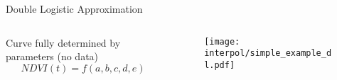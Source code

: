 
\begin{frame}[fragile]{Double Logistic Approximation}
    \begin{columns}
        \begin{column}{0.45\textwidth}
            Curve fully determined by parameters (no data)
            $$
                NDVI(t) = f(a,b,c,d,e)
            $$
            
        \end{column}
        \begin{column}{0.45\textwidth}
            \begin{figure}
                \texttt{[image: interpol/simple\_example\_dl.pdf]}
            \end{figure}
        \end{column}
    \end{columns}
\end{frame}





\newcommand{\RobItPlot}{fitted to different (SCL45) NDVI {TS}. Iterations of a robustifing refit (as indicated in section~\ref{sec:loess_robustify}) are also displayed.}





